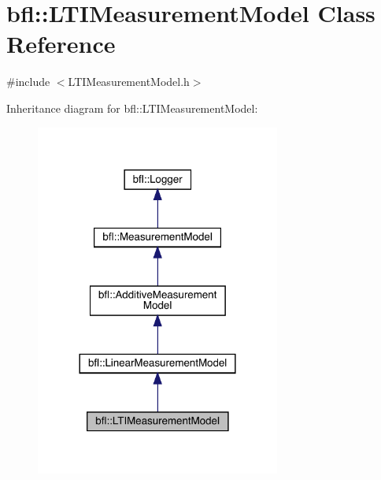 \hypertarget{classbfl_1_1LTIMeasurementModel}{}\section{bfl\+:\+:L\+T\+I\+Measurement\+Model Class Reference}
\label{classbfl_1_1LTIMeasurementModel}


{\ttfamily \#include $<$L\+T\+I\+Measurement\+Model.\+h$>$}



Inheritance diagram for bfl\+:\+:L\+T\+I\+Measurement\+Model\+:
\nopagebreak
\begin{figure}[H]
\begin{center}
\leavevmode
\includegraphics[width=228pt]{classbfl_1_1LTIMeasurementModel__inherit__graph}
\end{center}
\end{figure}
